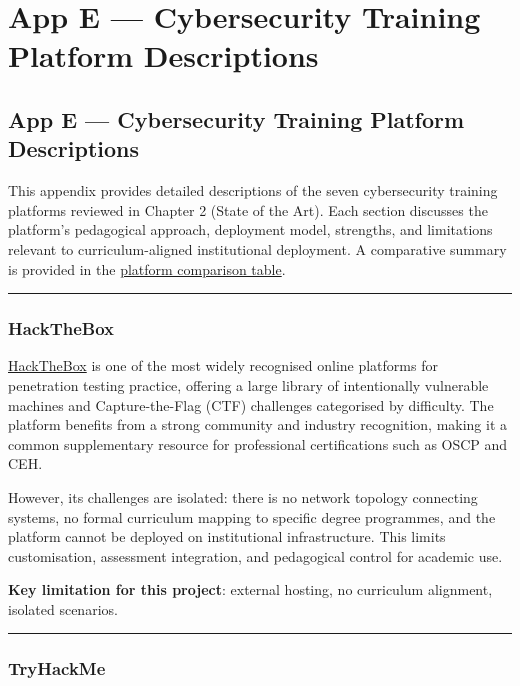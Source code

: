\chapter{App E --- Cybersecurity Training Platform Descriptions}

\section{App E --- Cybersecurity Training Platform Descriptions}

This appendix provides detailed descriptions of the seven cybersecurity training platforms reviewed in Chapter 2 (State of the Art). Each section discusses the platform's pedagogical approach, deployment model, strengths, and limitations relevant to curriculum-aligned institutional deployment. A comparative summary is provided in the \href{../\#platform-comparison}{platform comparison table}.

\begin{center}\rule{0.5\linewidth}{0.5pt}\end{center}

\subsection{HackTheBox}

\href{https://www.hackthebox.com/}{HackTheBox} is one of the most widely recognised online platforms for penetration testing practice, offering a large library of intentionally vulnerable machines and Capture-the-Flag (CTF) challenges categorised by difficulty. The platform benefits from a strong community and industry recognition, making it a common supplementary resource for professional certifications such as OSCP and CEH.

However, its challenges are isolated: there is no network topology connecting systems, no formal curriculum mapping to specific degree programmes, and the platform cannot be deployed on institutional infrastructure. This limits customisation, assessment integration, and pedagogical control for academic use.

\textbf{Key limitation for this project}: external hosting, no curriculum alignment, isolated scenarios.

\begin{center}\rule{0.5\linewidth}{0.5pt}\end{center}

\subsection{TryHackMe}

